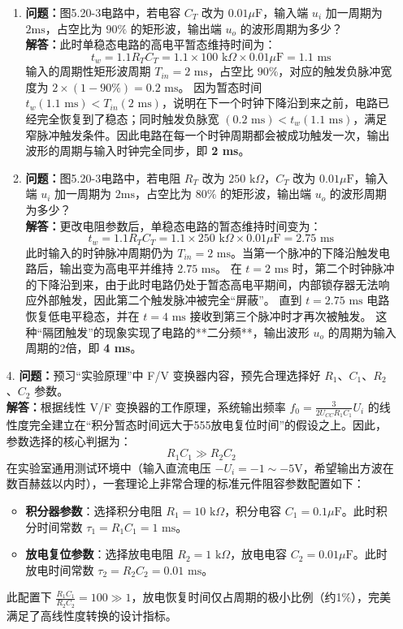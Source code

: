 \documentclass[10.5pt]{config}
\begin{document}
\begin{enumerate}[label=\arabic*., leftmargin=2em]
\begin{enumerate}[label=(\arabic*)]
        \item \textbf{问题：}图5.20-3电路中，若电容 $C_T$ 改为 $0.01\mu\text{F}$，输入端 $u_i$ 加一周期为 $2\text{ms}$，占空比为 $90\%$ 的矩形波，输出端 $u_o$ 的波形周期为多少？
        \\ \textbf{解答：}此时单稳态电路的高电平暂态维持时间为：
        $$t_w = 1.1 R_T C_T = 1.1 \times 100\text{ k}\Omega \times 0.01\mu\text{F} = 1.1\text{ ms}$$
        输入的周期性矩形波周期 $T_{in} = 2\text{ ms}$，占空比 $90\%$，对应的触发负脉冲宽度为 $2 \times (1 - 90\%) = 0.2\text{ ms}$。
        因为暂态时间 $t_w (1.1\text{ ms}) < T_{in} (2\text{ ms})$，说明在下一个时钟下降沿到来之前，电路已经完全恢复到了稳态；同时触发负脉宽 $(0.2\text{ ms}) < t_w (1.1\text{ ms})$，满足窄脉冲触发条件。因此电路在每一个时钟周期都会被成功触发一次，输出波形的周期与输入时钟完全同步，即 \textbf{2 ms}。

        \item \textbf{问题：}图5.20-3电路中，若电阻 $R_T$ 改为 $250\text{ k}\Omega$，$C_T$ 改为 $0.01\mu\text{F}$，输入端 $u_i$ 加一周期为 $2\text{ms}$，占空比为 $80\%$ 的矩形波，输出端 $u_o$ 的波形周期为多少？
        \\ \textbf{解答：}更改电阻参数后，单稳态电路的暂态维持时间变为：
        $$t_w = 1.1 R_T C_T = 1.1 \times 250\text{ k}\Omega \times 0.01\mu\text{F} = 2.75\text{ ms}$$
        此时输入的时钟脉冲周期仍为 $T_{in} = 2\text{ ms}$。当第一个脉冲的下降沿触发电路后，输出变为高电平并维持 $2.75\text{ ms}$。
        在 $t = 2\text{ ms}$ 时，第二个时钟脉冲的下降沿到来，由于此时电路仍处于暂态高电平期间，内部锁存器无法响应外部触发，因此第二个触发脉冲被完全“屏蔽”。
        直到 $t = 2.75\text{ ms}$ 电路恢复低电平稳态，并在 $t = 4\text{ ms}$ 接收到第三个脉冲时才再次被触发。
        这种“隔团触发”的现象实现了电路的**二分频**，输出波形 $u_o$ 的周期为输入周期的2倍，即 \textbf{4 ms}。
    \end{enumerate}

    \item[4.] \textbf{问题：}预习“实验原理”中 F/V 变换器内容，预先合理选择好 $R_1$、$C_1$、$R_2$、$C_2$ 参数。
    \\ \textbf{解答：}根据线性 V/F 变换器的工作原理，系统输出频率 $f_0 = \frac{3}{2 U_{CC} R_1 C_1} U_i$ 的线性度完全建立在“积分暂态时间远大于555放电复位时间”的假设之上。因此，参数选择的核心判据为：
    $$R_1 C_1 \gg R_2 C_2$$
    在实验室通用测试环境中（输入直流电压 $-U_i = -1 \sim -5\text{V}$，希望输出方波在数百赫兹以内时），一套理论上非常合理的标准元件阻容参数配置如下：
    \begin{itemize}
        \item \textbf{积分器参数}：选择积分电阻 $R_1 = 10\text{ k}\Omega$，积分电容 $C_1 = 0.1\mu\text{F}$。此时积分时间常数 $\tau_1 = R_1 C_1 = 1\text{ ms}$。
        \item \textbf{放电复位参数}：选择放电电阻 $R_2 = 1\text{ k}\Omega$，放电电容 $C_2 = 0.01\mu\text{F}$。此时放电时间常数 $\tau_2 = R_2 C_2 = 0.01\text{ ms}$。
    \end{itemize}
    此配置下 $\frac{R_1 C_1}{R_2 C_2} = 100 \gg 1$，放电恢复时间仅占周期的极小比例（约1\%），完美满足了高线性度转换的设计指标。
\end{enumerate}
\end{document}
